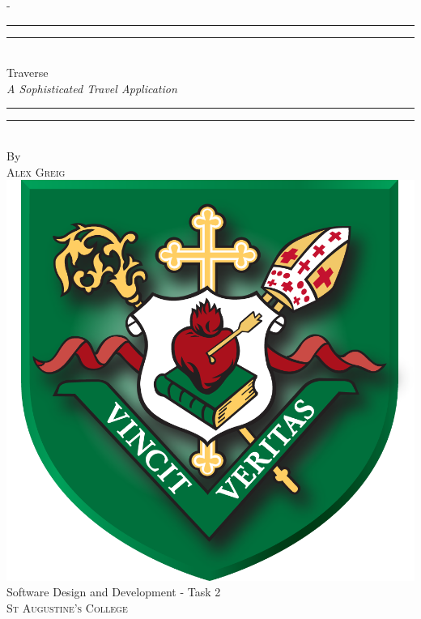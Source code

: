 \begin{titlingpage}
\begin{SingleSpace}
\calccentering{\unitlength} 
\begin{adjustwidth*}{\unitlength}{-\unitlength}
\vspace*{13mm}
\begin{center}
\rule[0.5ex]{\linewidth}{2pt}\vspace*{-\baselineskip}\vspace*{3.2pt}
\rule[0.5ex]{\linewidth}{1pt}\\[\baselineskip]
{\HUGE Traverse}\\[4mm]
{\Large \textit{A Sophisticated Travel Application}}\\
\rule[0.5ex]{\linewidth}{1pt}\vspace*{-\baselineskip}\vspace{3.2pt}
\rule[0.5ex]{\linewidth}{2pt}\\
\vspace{6.5mm}
{\large By}\\
\vspace{6.5mm}
{\large\textsc{Alex Greig}}\\
\vspace{10mm}
\includegraphics[scale=0.15]{logos/sta.png}
\\
\vspace{10mm}
{\large Software Design and Development - Task 2\\
\textsc{St Augustine's College}} \\


\end{center}
\end{adjustwidth*}
\end{SingleSpace}
\end{titlingpage}
